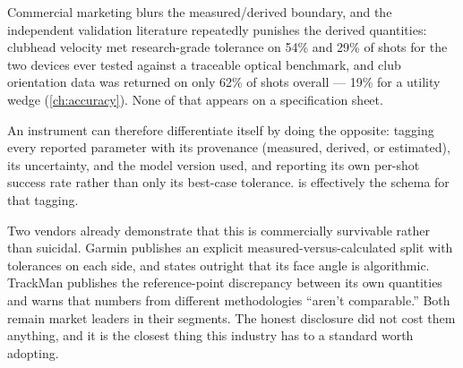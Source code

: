 Commercial marketing blurs the measured/derived boundary, and the
independent validation literature repeatedly punishes the derived
quantities: clubhead velocity met research-grade tolerance on 54\% and 29\%
of shots for the two devices ever tested against a traceable optical
benchmark, and club orientation data was returned on only 62\% of shots
overall --- 19\% for a utility wedge (\cref{ch:accuracy}). None of that
appears on a specification sheet.

An instrument can therefore differentiate itself by doing the opposite:
tagging every reported parameter with its provenance (measured, derived, or
estimated), its uncertainty, and the model version used, and reporting its
own per-shot success rate rather than only its best-case tolerance.
 is effectively the schema for that tagging.

Two vendors already demonstrate that this is commercially survivable rather
than suicidal. Garmin publishes an explicit measured-versus-calculated split
with tolerances on each side, and states outright that its face angle is
algorithmic. TrackMan publishes the reference-point discrepancy between its
own quantities and warns that numbers from different methodologies
``aren't comparable.'' Both remain market leaders in their segments. The
honest disclosure did not cost them anything, and it is the closest thing
this industry has to a standard worth adopting.
